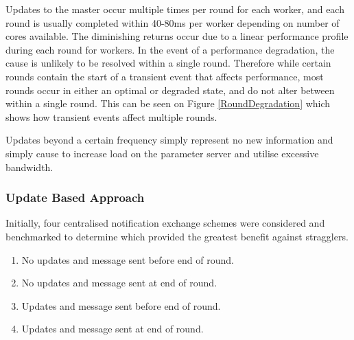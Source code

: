 \documentclass[12pt]{article}
\begin{document}
Updates to the master occur multiple times per round for each worker, and each round is usually completed within 40-80ms per worker depending on number of cores available. The diminishing returns occur due to a linear performance profile during each round for workers. In the event of a performance degradation, the cause is unlikely to be resolved within a single round. Therefore while certain rounds contain the start of a transient event that affects performance, most rounds occur in either an optimal or degraded state, and do not alter between within a single round. This can be seen on Figure \ref{RoundDegradation} which shows how transient events affect multiple rounds.



Updates beyond a certain frequency simply represent no new information and simply cause to increase load on the parameter server and utilise excessive bandwidth.
\newline
\subsubsection{Update Based Approach}
Initially, four centralised notification exchange schemes were considered and benchmarked to determine which provided the greatest benefit against stragglers.

\begin{enumerate}
\item No updates and message sent before end of round.
\item No updates and message sent at end of round.
\item Updates and message sent before end of round.
\item Updates and message sent at end of round.
\end{enumerate}
\end{document}
